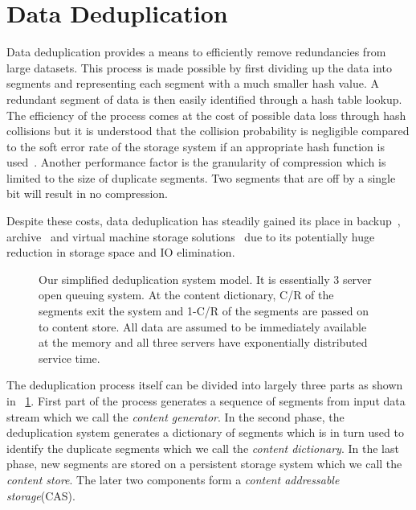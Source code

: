\section{Data Deduplication}
\label{DD}

Data deduplication provides a means to efficiently remove redundancies from large datasets.
This process is made possible by first dividing up the data into segments and representing each segment with a much smaller hash value.
A redundant segment of data is then easily identified through a hash table lookup.
The efficiency of the process comes at the cost of possible data loss through hash collisions but it is understood that the collision probability is negligible compared to the soft error rate of the storage system if an appropriate hash function is used~\cite{aronovich:2009, zhu:2008, bobbarjung:2006, muthitacharoen:2001}.
Another performance factor is the granularity of compression which is limited to the size of duplicate segments.
Two segments that are off by a single bit will result in no compression.

Despite these costs, data deduplication has steadily gained its place in backup~\cite{meister:2009, lillibridge:2009, zhu:2008}, archive~\cite{you:2005} and virtual machine storage solutions~\cite{smith:2008, jin:2009, clements:2009} due to its potentially huge reduction in storage space and IO elimination.

\begin{figure}[!t]
\centering

\captionsetup{format=myformat}
\caption{Our simplified deduplication system model. It is essentially 3 server open queuing system. At the content dictionary, C/R of the segments exit the system and 1-C/R of the segments are passed on to content store. All data are assumed to be immediately available at the memory and all three servers have exponentially distributed service time.}
\label{fig:queue}
\end{figure}

The deduplication process itself can be divided into largely three parts as shown in \figurename~\ref{fig:queue}. First part of the process generates a sequence of segments from input data stream which we call the \emph{content generator}. In the second phase, the deduplication system generates a dictionary of segments which is in turn used to identify the duplicate segments which we call the \emph{content dictionary}. In the last phase, new segments are stored on a persistent storage system which we call the \emph{content store}. The later two components form a \emph{content addressable storage}(CAS).

